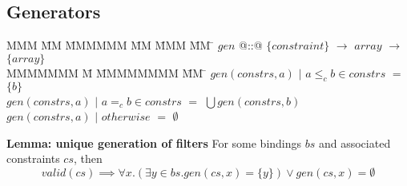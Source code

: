 \subsection{Generators}

\begin{tabbing}
MMM       \= MM \= MMMMMM \= MM \= MMM \= MM \= \kill
$gen$   \> @::@  \> $\{constraint\}$  \> $\to$ \> $array$ \> $\to$ \> $\{array\}$ \\
MMMMMMM                 \= M  \= MMMMMMMM \= MM \= \kill
$gen(constrs, a)$ \> $|$ \> $a \le_c b \in constrs$ \> $=$ \> $\{b\}$                        \\
$gen(constrs, a)$ \> $|$ \> $a =_c b \in constrs$   \> $=$ \> $\bigcup gen(constrs, b)$                        \\
$gen(constrs, a)$ \> $|$ \> $otherwise$             \> $=$ \> $\emptyset$                        \\
\end{tabbing}

\textbf{Lemma: unique generation of filters}
For some bindings $bs$ and associated constraints $cs$, then
\[
valid(cs) \implies \forall x. (\exists y \in bs. gen(cs, x) = \{y\}) \vee gen(cs, x) = \emptyset
\]


